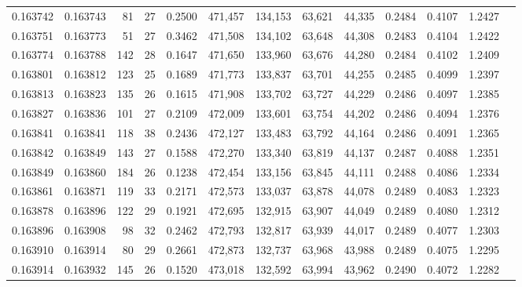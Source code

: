 \begin{tabular}{rrrrrrrrrrrrr}
0.163742 & 0.163743 &    81 &  27 &                                     0.2500 & 471,457 & 134,153 &  63,621 &  44,335 & 0.2484 & 0.4107 & 1.2427 \\
0.163751 & 0.163773 &    51 &  27 &                                     0.3462 & 471,508 & 134,102 &  63,648 &  44,308 & 0.2483 & 0.4104 & 1.2422 \\
0.163774 & 0.163788 &   142 &  28 &                                     0.1647 & 471,650 & 133,960 &  63,676 &  44,280 & 0.2484 & 0.4102 & 1.2409 \\
0.163801 & 0.163812 &   123 &  25 &                                     0.1689 & 471,773 & 133,837 &  63,701 &  44,255 & 0.2485 & 0.4099 & 1.2397 \\
0.163813 & 0.163823 &   135 &  26 &                                     0.1615 & 471,908 & 133,702 &  63,727 &  44,229 & 0.2486 & 0.4097 & 1.2385 \\
0.163827 & 0.163836 &   101 &  27 &                                     0.2109 & 472,009 & 133,601 &  63,754 &  44,202 & 0.2486 & 0.4094 & 1.2376 \\
0.163841 & 0.163841 &   118 &  38 &                                     0.2436 & 472,127 & 133,483 &  63,792 &  44,164 & 0.2486 & 0.4091 & 1.2365 \\
0.163842 & 0.163849 &   143 &  27 &                                     0.1588 & 472,270 & 133,340 &  63,819 &  44,137 & 0.2487 & 0.4088 & 1.2351 \\
0.163849 & 0.163860 &   184 &  26 &                                     0.1238 & 472,454 & 133,156 &  63,845 &  44,111 & 0.2488 & 0.4086 & 1.2334 \\
0.163861 & 0.163871 &   119 &  33 &                                     0.2171 & 472,573 & 133,037 &  63,878 &  44,078 & 0.2489 & 0.4083 & 1.2323 \\
0.163878 & 0.163896 &   122 &  29 &                                     0.1921 & 472,695 & 132,915 &  63,907 &  44,049 & 0.2489 & 0.4080 & 1.2312 \\
0.163896 & 0.163908 &    98 &  32 &                                     0.2462 & 472,793 & 132,817 &  63,939 &  44,017 & 0.2489 & 0.4077 & 1.2303 \\
0.163910 & 0.163914 &    80 &  29 &                                     0.2661 & 472,873 & 132,737 &  63,968 &  43,988 & 0.2489 & 0.4075 & 1.2295 \\
0.163914 & 0.163932 &   145 &  26 &                                     0.1520 & 473,018 & 132,592 &  63,994 &  43,962 & 0.2490 & 0.4072 & 1.2282 \\

\end{tabular}
